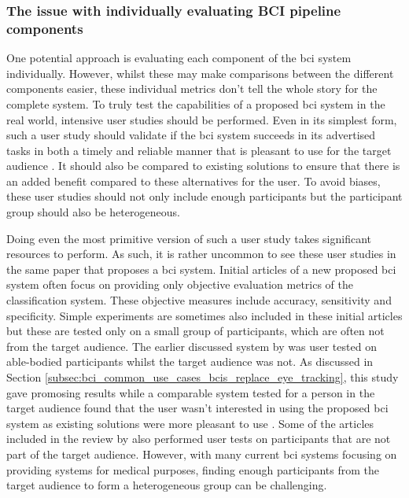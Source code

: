 
\subsubsection{The issue with individually evaluating BCI pipeline components}
\label{subsubsec:bci_opportunities_obstacles_lack_of_testing_individual_components}

One potential approach is evaluating each component of the \gls{bci} system individually.
However, whilst these may make comparisons between the different components easier, these individual metrics don't tell the whole story for the complete system.
To truly test the capabilities of a proposed \gls{bci} system in the real world, intensive user studies should be performed.
Even in its simplest form, such a user study should validate if the \gls{bci} system succeeds in its advertised tasks in both a timely and reliable manner that is pleasant to use for the target audience \citep{bci_review_arnau}.
It should also be compared to existing solutions to ensure that there is an added benefit compared to these alternatives for the user.
To avoid biases, these user studies should not only include enough participants but the participant group should also be heterogeneous.

Doing even the most primitive version of such a user study takes significant resources to perform.
As such, it is rather uncommon to see these user studies in the same paper that proposes a \gls{bci} system.
Initial articles of a new proposed \gls{bci} system often focus on providing only objective evaluation metrics of the classification system.
These objective measures include accuracy, sensitivity and specificity.
Simple  experiments are sometimes also included in these initial articles but these are tested only on a small group of participants, which are often not from the target audience.
The earlier discussed system by \citet{eye_tracking_vs_p300_comparable} was user tested on able-bodied participants whilst the target audience was not.
As discussed in Section \ref{subsec:bci_common_use_cases_bcis_replace_eye_tracking}, this study gave promosing results while a comparable system tested for a person in the target audience found that the user wasn't interested in using the proposed \gls{bci} system as existing solutions were more pleasant to use \citep{no_interest_in_using_p300}.
Some of the articles included in the review by \citet{bci_review_arnau} also performed user tests on participants that are not part of the target audience.
However, with many current \gls{bci} systems focusing on providing systems for medical purposes, finding enough participants from the target audience to form a heterogeneous group can be challenging.



